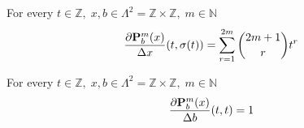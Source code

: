 \begin{cor}
    For every $t\in\mathbb{Z}, \; x,b\in\Lambda^2 = \mathbb{Z} \times \mathbb{Z}, \; m\in\mathbb{N}$
    \[
        \frac{\partial {\mathbf{P}}\sp{m} \sb{b}(x)}{\Delta x}(t, \sigma(t)) = \sum_{r=1}^{2m} \binom{2m+1}{r} t^{r}
    \]
\end{cor}
\begin{cor}
    For every $t\in\mathbb{Z}, \; x,b\in\Lambda^2 = \mathbb{Z} \times \mathbb{Z}, \; m\in\mathbb{N}$
    \[
        \frac{\partial {\mathbf{P}}\sp{m} \sb{b}(x)}{\Delta b}(t, t) = 1
    \]
\end{cor}